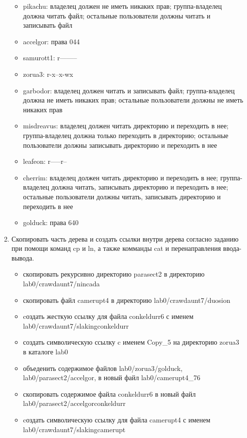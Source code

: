 \begin{enumerate}
\begin{itemize}
		 \item pikachu: владелец должен не иметь никаких прав; группа-владелец должна читать файл; остальные пользователи должны читать и записывать файл
		 \item accelgor: права 044
		 \item samurott1: r--------
		 \item zorua3: r-x--x-wx
		 \item garbodor: владелец должен читать и записывать файл; группа-владелец должна не иметь никаких прав; остальные пользователи должны не иметь никаких прав
		 \item misdreavus: владелец должен читать директорию и переходить в нее; группа-владелец должна только переходить в директорию; остальные пользователи должны записывать директорию и переходить в нее
		 \item leafeon: r-----r--
		 \item cherrim: владелец должен читать директорию и переходить в нее; группа-владелец должна читать, записывать директорию и переходить в нее; остальные пользователи должны читать, записывать директорию и переходить в нее
		 \item golduck: права 640
	\end{itemize}
	
	\item Скопировать часть дерева и создать ссылки внутри дерева согласно заданию при помощи команд cp и ln, а также комманды cat и перенаправления ввода-вывода.
	\begin{itemize}
		\item скопировать рекурсивно директорию parasect2 в директорию lab0/crawdaunt7/nincada
		\item скопировать файл camerupt4 в директорию lab0/crawdaunt7/duosion
		\item cоздать жесткую ссылку для файла conkeldurr6 с именем lab0/crawdaunt7/slakingconkeldurr
		\item создать символическую ссылку c именем Copy\_5 на директорию zorua3 в каталоге lab0
		\item объеденить содержимое файлов lab0/zorua3/golduck, lab0/parasect2/accelgor, в новый файл lab0/camerupt4\_76
		\item скопировать содержимое файла conkeldurr6 в новый файл lab0/parasect2/accelgorconkeldurr
		\item cоздать символическую ссылку для файла camerupt4 с именем lab0/crawdaunt7/slakingcamerupt
	\end{itemize}
	

\end{enumerate}
